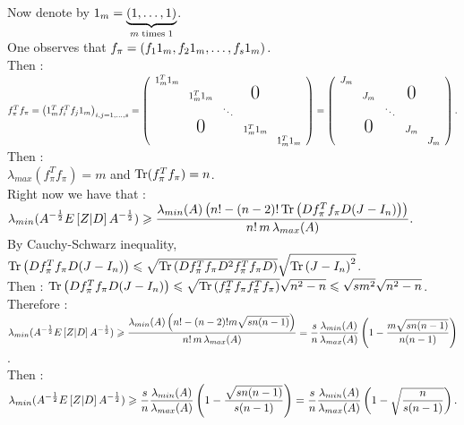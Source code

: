    Now denote by $1_{m} = \underbrace{\left(1,\dots,1\right)}_{m \;\text{times}\; 1}$.\\
    One observes that  $f_{\pi} = \left(f_{1}1_{m}, f_{2}1_{m}, \dots, f_{s}1_{m}\right).$\\
Then :\\
$f_{\pi}^{T} f_{\pi} = \pare{1_{m}^{T}f_{i}^{T}f_{j}1_{m}}_{i,j=1,\dots,s} =    \left(
    \begin{array}{ccccc}
    1_{m}^{T}1_{m}                                   \\
      & 1_{m}^{T}1_{m}              &   & \text{\huge0}\\
      &               & \ddots               \\
      & \text{\huge0} &   & 1_{m}^{T}1_{m}            \\
      &               &   &   & 1_{m}^{T}1_{m} 
    \end{array}
    \right) = \left(
    \begin{array}{ccccc}
    J_{m}                                 \\
      & J_{m}              &   & \text{\huge0}\\
      &               & \ddots               \\
      & \text{\huge0} &   & J_{m}          \\
      &               &   &   & J_{m}
    \end{array}
    \right).$
Then :\\
$\lambda_{max}(f_{\pi}^{T}f_{\pi}) = m$ and $\operatorname{Tr}(f_{\pi}^{T} f_{\pi}) = n$.\\

Right now we have that :\\

$\displaystyle \lambda_{min}(A^{-\frac12}E\left[Z|D\right]A^{-\frac12} ) \geqslant \displaystyle  \frac{\lambda_{min}(A) \left( n! - (n-2)! \operatorname{Tr}\left(D f_{\pi}^{T} f_{\pi} D (J-I_{n})\right)    \right)  }{ n! \,m\, \lambda_{max}(A) }. $\\

By Cauchy-Schwarz inequality, $ \operatorname{Tr}\left(D f_{\pi}^{T} f_{\pi} D (J-I_{n})\right) \leqslant  \sqrt{\operatorname{Tr}\left(D f_{\pi}^{T} f_{\pi} D^{2} f_{\pi}^{T} f_{\pi} D \right) }\sqrt{ \operatorname{Tr}\left(J-I_{n}\right)^{2}}$.\\
Then : $ \operatorname{Tr}\left(D f_{\pi}^{T} f_{\pi} D (J-I_{n})\right) \leqslant  \sqrt{\operatorname{Tr}\left( f_{\pi}^{T} f_{\pi} f_{\pi}^{T} f_{\pi} \right) } \sqrt{n^{2}-n}\leqslant \sqrt{s m^{2}}\sqrt{n^{2}-n} $.\\
Therefore :\\
$\displaystyle \lambda_{min}(A^{-\frac12}E\left[Z|D\right]A^{-\frac12} ) \geqslant  \frac{\lambda_{min}(A) \left( n! - (n-2)! m\sqrt{s n (n-1)}   \right)  }{ n! \,m\, \lambda_{max}(A) } =\frac{s}{n} \frac{\lambda_{min}(A)}{\lambda_{max}(A)}\left(1-\frac{m\sqrt{s n (n-1)}}{n(n-1)}\right) $.\\
Then :\\
$\displaystyle \lambda_{min}(A^{-\frac12}E\left[Z|D\right]A^{-\frac12} ) \geqslant \frac{s}{n} \frac{\lambda_{min}(A)}{\lambda_{max}(A)}\left(1-\frac{\sqrt{s n (n-1)}}{s(n-1)}\right) = \frac{s}{n} \frac{\lambda_{min}(A)}{\lambda_{max}(A)}\left(1-\sqrt{\frac{n}{s(n-1)}}\right).$\\

